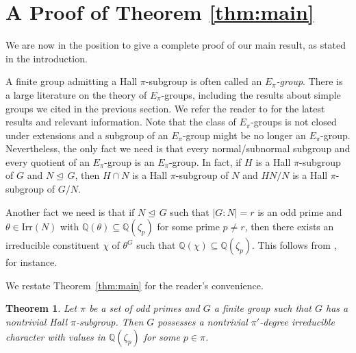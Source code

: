 \documentclass[12pt]{amsart}
\newtheorem{theorem}{Theorem}[section]
\theoremstyle{definition}
\numberwithin{equation}{section}
\newcommand{\Irr}{{\mathrm {Irr}}}
\newcommand{\QQ}{{\mathbb Q}}
\def\nor{\trianglelefteq\,}
\begin{document}
\section{A Proof of Theorem \ref{thm:main}}

We are now in the position to give a complete proof of our main result, as stated in the introduction.

A finite group admitting a Hall $\pi$-subgroup is often called an
\emph{$E_\pi$-group}. There is a large literature on the theory of
$E_\pi$-groups, including the results about simple groups we cited in
the previous section. We refer the reader to \cite{RV10} for the
latest results and relevant information. Note that the class of
$E_\pi$-groups is not closed under extensions and a subgroup of an
$E_\pi$-group might be no longer an $E_\pi$-group. Nevertheless, the
only fact we need is that every normal/subnormal subgroup and every
quotient of an $E_\pi$-group is an $E_\pi$-group. In fact, if $H$ is
a Hall $\pi$-subgroup of $G$ and $N\nor G$, then $H\cap N$ is a Hall
$\pi$-subgroup of $N$ %
and $HN/N$ is %
a Hall $\pi$-subgroup of %
$G/N$.


Another fact we need is that %
if $N\nor G$ such %
that %
$|G:N|=r$ is %
an
odd prime and $\theta\in \Irr(N)$ with %
$\QQ(\theta)\subseteq
\QQ(\zeta_p)$ for %
some prime $p\neq r$, then there exists an
irreducible constituent $\chi$ of $\theta^G$ such that
$\QQ(\chi)\subseteq \QQ(\zeta_p)$. This follows from
\cite[Lemma~2.2]{GHSV21}, for instance.

We restate Theorem~\ref{thm:main} for the reader's convenience.

\begin{theorem}
Let $\pi$ be a set of odd primes and $G$ a finite group such that
$G$ has a nontrivial Hall $\pi$-subgroup. Then $G$ possesses a
nontrivial $\pi'$-degree irreducible character with values %
in
$\QQ(\zeta_p)$ for %
some $p\in\pi$.
\end{theorem}
\end{document}
